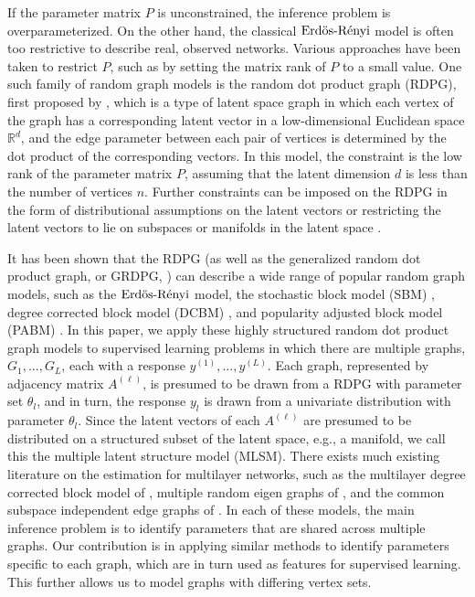 \documentclass[12pt]{article}
\begin{document}
If the parameter matrix \(P\) is unconstrained, the inference problem is
overparameterized. On the other hand, the classical \(\text{Erd\"{o}s-R\'{e}nyi}\) model is
often too restrictive to describe real, observed networks. Various
approaches have been taken to restrict \(P\), such as by setting the
matrix rank of \(P\) to a small value. One such family of random graph
models is the random dot product graph (RDPG), first proposed by
\citet{10.1007/978-3-540-77004-6_11}, which is a type of latent space
graph in which each vertex of the graph has a corresponding latent
vector in a low-dimensional Euclidean space \(\mathbb{R}^d\), and the
edge parameter between each pair of vertices is determined by the dot
product of the corresponding vectors. In this model, the constraint is
the low rank of the parameter matrix \(P\), assuming that the latent
dimension \(d\) is less than the number of vertices \(n\). Further
constraints can be imposed on the RDPG in the form of distributional
assumptions on the latent vectors or restricting the latent vectors to
lie on subspaces or manifolds in the latent space
\citep{athreya2020estimation}.

It has been shown that the RDPG (as well as the generalized random dot
product graph, or GRDPG, \citep{rubindelanchy2017statistical}) can
describe a wide range of popular random graph models, such as the
\(\text{Erd\"{o}s-R\'{e}nyi}\) model, the stochastic block model (SBM)
\citep{doi:10.1080/0022250X.1971.9989788}, degree corrected block model
(DCBM) \citep{Karrer_2011}, and popularity adjusted block model (PABM)
\citep{307cbeb9b1be48299388437423d94bf1}. In this paper, we apply these
highly structured random dot product graph models to supervised learning
problems in which there are multiple graphs, \(G_1, ..., G_L\), each
with a response \(y^{(1)}, ..., y^{(L)}\). Each graph, represented by
adjacency matrix \(A^{(\ell)}\), is presumed to be drawn from a RDPG
with parameter set \(\theta_l\), and in turn, the response \(y_l\) is
drawn from a univariate distribution with parameter \(\theta_l\). Since
the latent vectors of each \(A^{(\ell)}\) are presumed to be distributed
on a structured subset of the latent space, e.g., a manifold, we call
this the multiple latent structure model (MLSM). There exists much
existing literature on the estimation for multilayer networks, such as
the multilayer degree corrected block model of
\citet{agterberg2022joint}, multiple random eigen graphs of
\citet{8889404}, and the common subspace independent edge graphs of
\citet{arroyo2020inference}. In each of these models, the main inference
problem is to identify parameters that are shared across multiple
graphs. Our contribution is in applying similar methods to identify
parameters specific to each graph, which are in turn used as features
for supervised learning. This further allows us to model graphs with
differing vertex sets.
\end{document}
